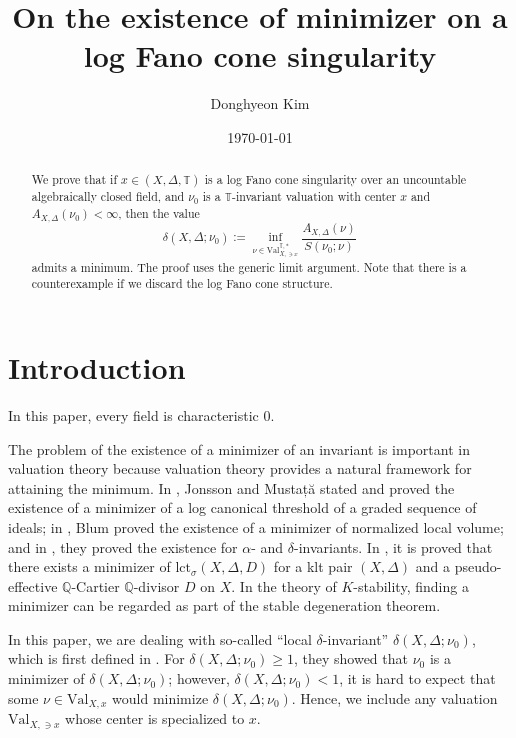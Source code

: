 \documentclass[a4paper,12pt]{amsart}
\title[On the existence of minimizer on a log Fano cone singularity]{On the existence of minimizer on a log Fano cone singularity}
\date{\today}
\theoremstyle{definition} %
\theoremstyle{remark}
\numberwithin{equation}{section}
\newcommand{\Q}{\mathbb{Q}}
\begin{document}
\author[D.~Kim]{Donghyeon Kim}
\address[Donghyeon Kim]{Department of Mathematics, Yonsei University, 50 Yonsei-ro, Seodaemun-gu, Seoul 03722, Republic of Korea}

\begin{abstract}
We prove that if $x\in (X,\Delta,\mathbb{T})$ is a log Fano cone singularity over an uncountable algebraically closed field, and $\nu_0$ is a $\mathbb{T}$-invariant valuation with center $x$ and $A_{X,\Delta}(\nu_0)<\infty$, then the value
$$ \delta(X,\Delta;\nu_0):=\inf_{\nu\in \mathrm{Val}^{\mathbb{T},*}_{X,\ni x}}\frac{A_{X,\Delta}(\nu)}{S(\nu_0;\nu)}$$
admits a minimum. The proof uses the generic limit argument. Note that there is a counterexample if we discard the log Fano cone structure.
\end{abstract}

\maketitle
\allowdisplaybreaks

\section{Introduction}
In this paper, every field is characteristic $0$.

\smallskip

The problem of the existence of a minimizer of an invariant is important in valuation theory because valuation theory provides a natural framework for attaining the minimum. In \cite{JM12}, Jonsson and Mustață stated and proved the existence of a minimizer of a log canonical threshold of a graded sequence of ideals; in \cite{Blu18}, Blum proved the existence of a minimizer of normalized local volume; and in \cite{BJ20}, they proved the existence for $\alpha$- and $\delta$-invariants. In \cite{CJKL25}, it is proved that there exists a minimizer of $\mathrm{lct}_{\sigma}(X,\Delta,D)$ for a klt pair $(X,\Delta)$ and a pseudo-effective $\Q$-Cartier $\Q$-divisor $D$ on $X$. In the theory of $K$-stability, finding a minimizer can be regarded as part of the stable degeneration theorem.

\smallskip

In this paper, we are dealing with so-called ``local $\delta$-invariant'' $\delta(X,\Delta;\nu_0)$, which is first defined in \cite{XZ20}. For $\delta(X,\Delta;\nu_0)\ge 1$, they showed that $\nu_0$ is a minimizer of $\delta(X,\Delta;\nu_0)$; however, $\delta(X,\Delta;\nu_0)<1$, it is hard to expect that some $\nu\in \mathrm{Val}_{X,x}$ would minimize $\delta(X,\Delta;\nu_0)$. Hence, we include any valuation $\mathrm{Val}_{X,\ni x}$ whose center is specialized to $x$.
\end{document}
